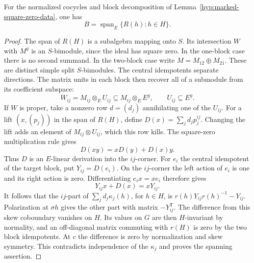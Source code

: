\begin{lemma}\label{lem:marked-square-zero-span}
For the normalized cocycles and block decomposition of
Lemma~\ref{hyp:marked-square-zero-data}, one has
\[
   B=\operatorname{span}_E\{R(h):h\in H\}.
\]
\end{lemma}

\begin{proof}
The span of \(R(H)\) is a subalgebra
mapping onto \(S\). Its intersection \(W\) with \(M^g\) is an
\(S\)-bimodule, since the ideal has square zero. In the one-block
case there is no second summand. In the two-block case write
\(M=M_{12}\oplus M_{21}\). These are distinct simple split
\(S\)-bimodules. The central idempotents separate directions. The matrix units in each block then recover all of a submodule from its coefficient subspace:
\[
 W_{ij}=M_{ij}\otimes_E U_{ij}\subseteq M_{ij}\otimes_E E^g,\qquad U_{ij}\subseteq E^g .
\] If \(W\) is proper, take a nonzero row \(d=(d_j)\) annihilating
one of the \(U_{ij}\). For a lift \((x,(p_j))\) in the span of
\(R(H)\), define \(D(x)=\sum_j d_j p_j^{ij}\). Changing the lift
adds an element of \(M_{ij}\otimes U_{ij}\), which this row kills.
The square-zero multiplication rule gives
\[
                  D(xy)=xD(y)+D(x)y.
\]
Thus \(D\) is an \(E\)-linear derivation into the \(ij\)-corner.
For \(e_i\) the central idempotent of
the target block, put \(Y_{ij}=D(e_i)\). On the \(ij\)-corner the left action of \(e_i\) is one
and its right action is zero. Differentiating \(e_i x=xe_i\)
therefore gives
\[
                  Y_{ij}x + D(x) = xY_{ij}.
\] It follows
that the \(ij\)-part of \(\sum_j d_j\kappa_j(h)\), for \(h\in H\),
is \(r(h)Y_{ij}r(h)^{-1}-Y_{ij}\). Polarization at \(\sigma h\)
gives the other part with matrix \(-Y_{ij}^{\mathsf T}\). The
difference from this skew coboundary vanishes on \(H\). Its
values on \(G\) are then \(H\)-invariant by normality, and an
off-diagonal matrix commuting with \(r(H)\) is zero by the
two block idempotents. At \(c\) the difference is zero by
normalization and skew symmetry. This contradicts independence
of the \(\kappa_j\) and proves the spanning assertion.

\end{proof}


